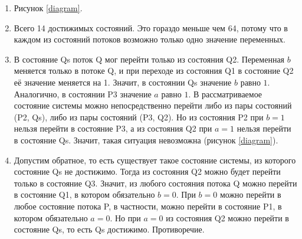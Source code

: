 \documentclass{article}
\begin{document}
\begin{enumerate}
    \item Рисунок \ref{diagram}.
    \item Всего 14 достижимых состояний.
          Это гораздо меньше чем 64, потому что в каждом из состояний потоков возможно только одно значение переменных.
    \item В состояние Qs поток Q мог перейти только из состояния Q2.
          Переменная $b$ меняется только в потоке Q, и при переходе из состояния Q1 в состояние Q2 её значение меняется на 1.
          Значит, в состоянии Qs значение $b$ равно $1$. Аналогично, в состоянии P3 значение $a$ равно $1$.
          В рассматриваемое состояние системы можно непосредственно перейти либо из пары состояний (P2, Qs),
          либо из пары состояний (P3, Q2).
          Но из состояния P2 при $b=1$ нельзя перейти в состояние P3, а из состояния Q2 при $a=1$ нельзя перейти в состояние Qs.
          Значит, такая ситуация невозможна (рисунок \ref{diagram}).
    \item Допустим обратное, то есть существует такое состояние системы, из которого состояние Qs не достижимо.
          Тогда из состояния Q2 можно будет перейти только в состояние Q3.
          Значит, из любого состояния потока Q можно перейти в состояние Q1, в котором обязательно $b=0$.
          При $b=0$ можно перейти в любое состояние потока P, в частности, можно перейти в состояние P1, в котором обязательно $a=0$.
          Но при $a=0$ из состояния Q2 можно перейти в состояние Qs, то есть Qs достижимо. Противоречие.
\end{enumerate}
\end{document}
